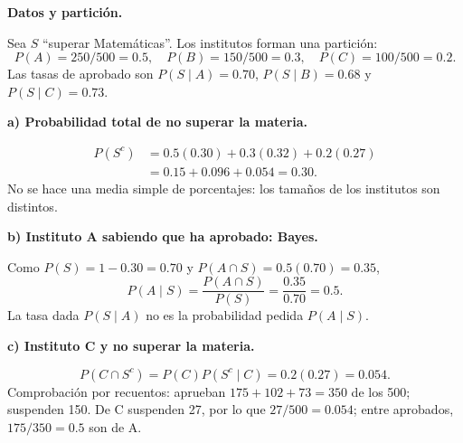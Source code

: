 \textbf{Datos y partición.}\par\nopagebreak[4]
Sea $S$ ``superar Matemáticas''. Los institutos forman una partición:
\[
P(A)=250/500=0.5,\quad P(B)=150/500=0.3,\quad P(C)=100/500=0.2.
\]
Las tasas de aprobado son $P(S\mid A)=0.70$, $P(S\mid B)=0.68$ y $P(S\mid C)=0.73$.

\textbf{a) Probabilidad total de no superar la materia.}\par\nopagebreak[4]
\[
\begin{aligned}
P(S^c)&=0.5(0.30)+0.3(0.32)+0.2(0.27)\\
&=0.15+0.096+0.054=\boxed{0.30}.
\end{aligned}
\]
No se hace una media simple de porcentajes: los tamaños de los institutos son distintos.

\textbf{b) Instituto A sabiendo que ha aprobado: Bayes.}\par\nopagebreak[4]
Como $P(S)=1-0.30=0.70$ y $P(A\cap S)=0.5(0.70)=0.35$,
\[
P(A\mid S)=\frac{P(A\cap S)}{P(S)}=\frac{0.35}{0.70}=\boxed{0.5}.
\]
La tasa dada $P(S\mid A)$ no es la probabilidad pedida $P(A\mid S)$.

\textbf{c) Instituto C y no superar la materia.}\par\nopagebreak[4]
\[
P(C\cap S^c)=P(C)P(S^c\mid C)=0.2(0.27)=\boxed{0.054}.
\]
Comprobación por recuentos: aprueban $175+102+73=350$ de los 500; suspenden 150. De C suspenden 27, por lo que $27/500=0.054$; entre aprobados, $175/350=0.5$ son de A.
